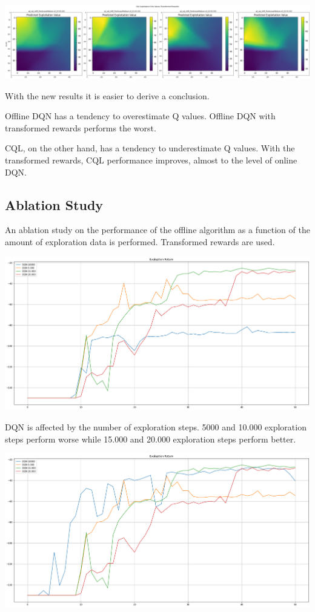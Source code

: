 \documentclass[11pt]{article}
\begin{document}
    \hspace*{-0.6in}
    \includegraphics[scale=0.20]{p2/q2-p1-explt-cql-trans}

    With the new results it is easier to derive a conclusion.

    Offline DQN has a tendency to overestimate Q values.
    Offline DQN with transformed rewards performs the worst.

    CQL, on the other hand, has a tendency to underestimate Q values.
    With the transformed rewards, CQL performance improves, almost to the level of online DQN.


    \subsection{Ablation Study}

    An ablation study on the performance of the offline algorithm as a function of the amount of exploration data is performed.
    Transformed rewards are used.

    \hspace*{-0.6in}
    \includegraphics[scale=0.30]{p2-p2/dqn-eval}

    DQN is affected by the number of exploration steps.
    5000 and 10.000 exploration steps perform worse while 15.000 and 20.000 exploration steps perform better.

    \hspace*{-0.6in}
    \includegraphics[scale=0.30]{p2-p2/cql-eval}
\end{document}
